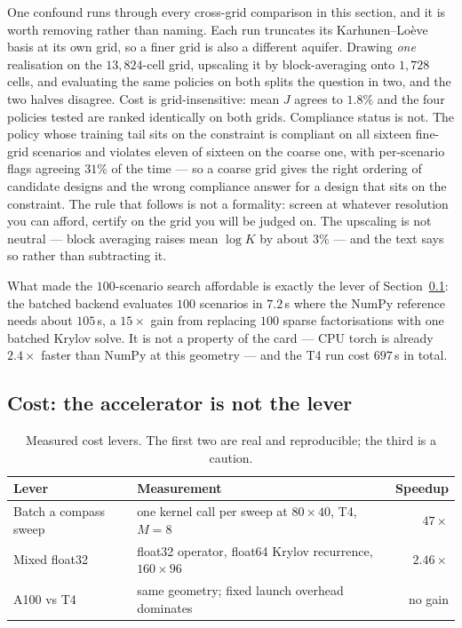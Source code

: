 One confound runs through every cross-grid comparison in this section, and it is
worth removing rather than naming. Each run truncates its Karhunen--Lo\`eve basis
at its own grid, so a finer grid is also a different aquifer. Drawing \emph{one}
realisation on the $13{,}824$-cell grid, upscaling it by block-averaging onto
$1{,}728$ cells, and evaluating the same policies on both splits the question in
two, and the two halves disagree. Cost is grid-insensitive: mean $J$ agrees to
$1.8\%$ and the four policies tested are ranked identically on both grids.
Compliance status is not. The policy whose training tail sits on the constraint is
compliant on all sixteen fine-grid scenarios and violates eleven of sixteen on the
coarse one, with per-scenario flags agreeing $31\%$ of the time --- so a coarse
grid gives the right ordering of candidate designs and the wrong compliance answer
for a design that sits on the constraint. The rule that follows is not a
formality: screen at whatever resolution you can afford, certify on the grid you
will be judged on. The upscaling is not neutral --- block averaging raises mean
$\log K$ by about $3\%$ --- and the text says so rather than subtracting it.

What made the $100$-scenario search affordable is exactly the lever of
Section~\ref{sec:rescost}: the batched backend evaluates $100$ scenarios in
$7.2$\,s where the NumPy reference needs about $105$\,s, a $15\times$ gain from
replacing $100$ sparse factorisations with one batched Krylov solve. It is not a
property of the card --- CPU torch is already $2.4\times$ faster than NumPy at
this geometry --- and the T4 run cost $697$\,s in total.

\subsection{Cost: the accelerator is not the lever}
\label{sec:rescost}

\begin{table}[htbp]
\centering
\small
\caption{Measured cost levers. The first two are real and reproducible; the
third is a caution.}
\label{tab:cost}
\begin{tabularx}{\textwidth}{@{}lXr@{}}
\toprule
Lever & Measurement & Speedup \\
\midrule
Batch a compass sweep & one kernel call per sweep at $80\times40$, T4, $M=8$ & $47\times$ \\
Mixed float32 & float32 operator, float64 Krylov recurrence, $160\times96$ & $2.46\times$ \\
A100 vs T4 & same geometry; fixed launch overhead dominates & no gain \\
\bottomrule
\end{tabularx}
\end{table}

